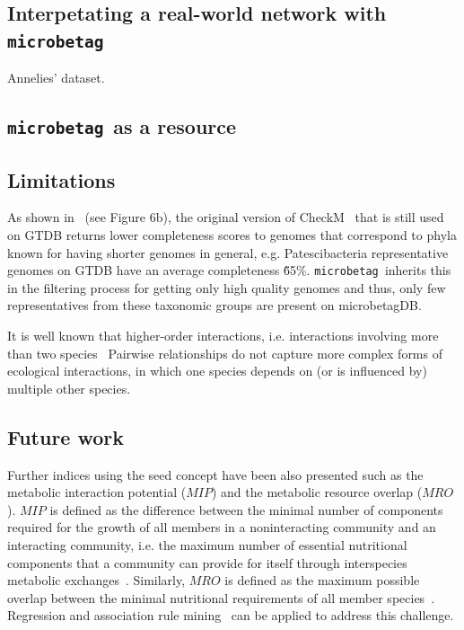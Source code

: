 \documentclass[sn-mathphys,Numbered, lineno]{sn-jnl}  %
\theoremstyle{thmstyleone}%
\theoremstyle{thmstyletwo}%
\theoremstyle{thmstylethree}%
\newcommand{\microbetag}{\texttt{microbetag }}
\begin{document}
    \subsection*{Interpetating a real-world network with \microbetag}
    \label{subsec:usecase}


        Annelies' dataset. 


    \subsection*{\microbetag as a resource }
    \label{subsec:resource}



    \subsection*{Limitations}
    \label{subsec:limitations}


        As shown in~\cite{chklovski2023checkm2} (see Figure 6b), the original version of CheckM~\cite{parks2015checkm} that is still used on GTDB returns lower completeness scores to genomes that correspond to phyla known for having shorter genomes in general, e.g. Patescibacteria representative genomes on GTDB have an average completeness \~65\%.
        \microbetag inherits this in the filtering process for getting only high quality genomes and thus, only few representatives from these taxonomic groups are present on microbetagDB.


        It is well known that higher-order interactions, i.e. interactions involving more than two species~\cite{zelezniak2015metabolic}
        Pairwise relationships do not capture more complex forms of ecological interactions, in which one species depends on (or is influenced by) multiple other species.~\cite{faust2012microbialReviewInteractions}
    




    \subsection*{Future work}
    \label{subsec:future}


        Further indices using the seed concept have been also presented such as the metabolic interaction potential ($MIP$) and the metabolic resource overlap ($MRO$).
        $MIP$ is defined as the difference between the minimal number of components required for the growth of all members in a noninteracting community and an interacting community, i.e. the maximum number of essential nutritional components that a community can provide for itself through interspecies metabolic exchanges~\cite{zelezniak2015metabolic}.
        Similarly, $MRO$ is defined as the maximum possible overlap between the minimal nutritional requirements of all member species~\cite{zelezniak2015metabolic}.
        Regression and association rule mining~\cite{assocciationRuleMining} can be applied to address this challenge.
\end{document}

